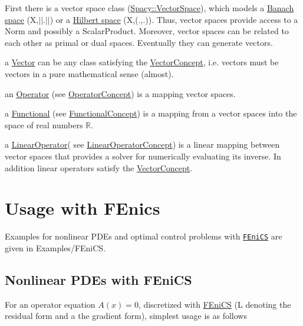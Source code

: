 \begin{DoxyItemize}
\item First there is a vector space class (\hyperlink{classSpacy_1_1VectorSpace}{Spacy\+::\+Vector\+Space}), which models a \hyperlink{namespaceSpacy_abfc17f845736365ee79be8ce68d50b27}{Banach space}  (X,$\vert$$\vert$.$\vert$$\vert$) or a \hyperlink{namespaceSpacy_a63c49d211bf214be1fb321440ed03aad}{Hilbert space}  (X,(.,.)). Thus, vector spaces provide access to a Norm and possibly a Scalar\+Product. Moreover, vector spaces can be related to each other as primal or dual spaces. Eventually they can generate vectors.
\item a \hyperlink{classSpacy_1_1Vector}{Vector} can be any class satisfying the \hyperlink{group__ConceptGroup_gac8fbeed0f838941e90ebe635a546e1db}{Vector\+Concept}, i.\+e. vectors must be vectors in a pure mathematical sense (almost).
\item an \hyperlink{classSpacy_1_1Operator}{Operator} (see \hyperlink{group__ConceptGroup_ga0cd6ba53feff75abbb6822b45fd6265e}{Operator\+Concept}) is a mapping vector spaces.
\item a \hyperlink{classSpacy_1_1Functional}{Functional} (see \hyperlink{group__ConceptGroup_gae45328d2e01ef6c8e5d948b69fda385f}{Functional\+Concept}) is a mapping from a vector spaces into the space of real numbers $ \mathbb{R} $.
\item a \hyperlink{classSpacy_1_1LinearOperator}{Linear\+Operator}( see \hyperlink{group__ConceptGroup_ga8d3bdfc9abd844ab446a31fcd3f8ef8c}{Linear\+Operator\+Concept}) is a linear mapping between vector spaces that provides a solver for numerically evaluating its inverse. In addition linear operators satisfy the \hyperlink{group__ConceptGroup_gac8fbeed0f838941e90ebe635a546e1db}{Vector\+Concept}.
\end{DoxyItemize}\hypertarget{index_sec_usage_fenics}{}\section{Usage with F\+Enics}\label{index_sec_usage_fenics}
Examples for nonlinear P\+D\+Es and optimal control problems with \href{http://www.fenicsproject.org}{\tt F\+Eni\+C\+S} are given in Examples/\+F\+Eni\+C\+S.\hypertarget{index_sub_usage_fenics_pde}{}\subsection{Nonlinear P\+D\+Es with F\+Eni\+C\+S}\label{index_sub_usage_fenics_pde}
For an operator equation $A(x)=0$, discretized with \hyperlink{namespaceSpacy_1_1FEniCS}{F\+Eni\+C\+S} (\textquotesingle{}L\textquotesingle{} denoting the residual form and \textquotesingle{}a\textquotesingle{} the gradient form), simplest usage is as follows 
